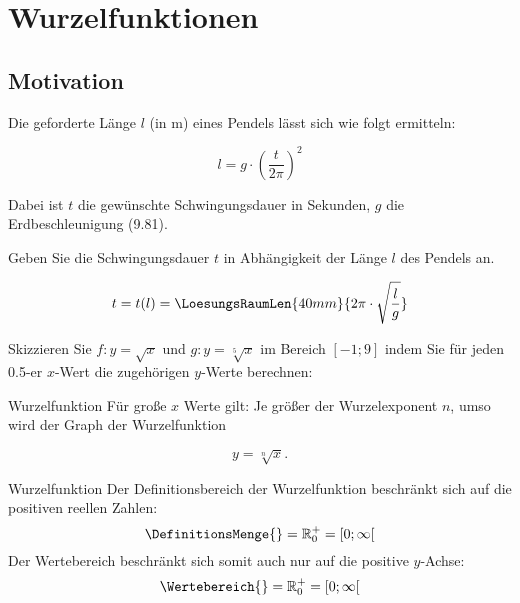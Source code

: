 \section{Wurzelfunktionen}

\subsection{Motivation}

Die geforderte Länge $l$ (in m) eines Pendels lässt sich wie folgt ermitteln:

$$l = g \cdot{} \left(\frac{t}{2\pi}\right)^2$$


Dabei ist $t$ die gewünschte Schwingungsdauer in Sekunden, $g$ die
Erdbeschleunigung (9.81).

Geben Sie die Schwingungsdauer $t$ in Abhängigkeit der Länge $l$ des
Pendels an.

$$t = t(l) = \LoesungsRaumLen{40mm}{2\pi \cdot{} \sqrt{\frac{l}{g}}}$$



\newpage

Skizzieren Sie $f: y = \sqrt{x}$ und $g: y=\sqrt[5]{x}$ im Bereich $[-1; 9]$ indem Sie für jeden 0.5-er $x$-Wert die zugehörigen $y$-Werte berechnen:


\begin{bemerkung}{Wurzelfunktion}{}
Für große $x$ Werte gilt: Je größer der Wurzelexponent $n$, umso
 wird der Graph der Wurzelfunktion

$$y=\sqrt[n]{x}.$$ 

\end{bemerkung}


\begin{definition}{Wurzelfunktion}{}
  Der Definitionsbereich der Wurzelfunktion beschränkt sich auf die
  positiven reellen Zahlen:
  $$\DefinitionsMenge{} = \mathbb{R}_0^{+} = [0;\infty[$$
      Der Wertebereich beschränkt sich somit auch nur auf die positive $y$-Achse:
  $$\Wertebereich{} = \mathbb{R}_0^{+} = [0;\infty[$$
      
\end{definition}
\newpage

